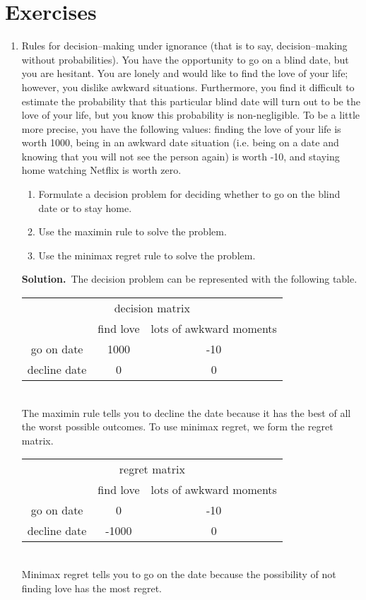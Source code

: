 \documentclass[12pt]{book}
\newcommand{\bs}{\textbf{Solution.}~}
\begin{document}
\section{Exercises}
\begin{enumerate}

\item Rules for decision--making under ignorance (that is to
  say, decision--making without probabilities). You have the opportunity to go on a
  blind date, but you are hesitant.  You are lonely and would like to
  find the love of your life; however, you dislike awkward
  situations. Furthermore, you find it difficult to estimate the
  probability that this particular blind date will turn out to be the
  love of your life, but you know this probability is
  non-negligible. To be a little more precise, you have the following
  values: finding the love of your life is worth 1000, being in an
  awkward date situation (i.e. being on a date and knowing that you
  will not see the person again) is worth -10, and staying home
  watching Netflix is worth zero.

\begin{enumerate}
\item Formulate a decision problem for deciding whether to go on the
blind date or to stay home.
\item Use the maximin rule to solve the problem.
\item Use the minimax regret rule to solve the problem.
\end{enumerate}

\begin{solution}
\bs The decision problem can be represented with the following table.
\\[.2in]
\begin{tabular}{ccc}
\multicolumn{3}{c}{decision matrix} \\
 & find love & lots of awkward moments \\ \hline
go on date & 1000 & -10 \\
decline date & 0 & 0 
\end{tabular}
\\[.2in] 
The maximin rule tells you to decline the date because it has
the best of all the worst possible outcomes. To use minimax regret, we
form the regret matrix.  \\[.2in]
\begin{tabular}{ccc}
\multicolumn{3}{c}{regret matrix} \\
 & find love & lots of awkward moments \\ \hline
go on date & 0 & -10 \\
decline date & -1000 & 0
\end{tabular}
\\[.2in] Minimax regret tells you to go on the date because the
possibility of not finding love has the most regret.
\end{solution}



\end{enumerate}
\end{document}
